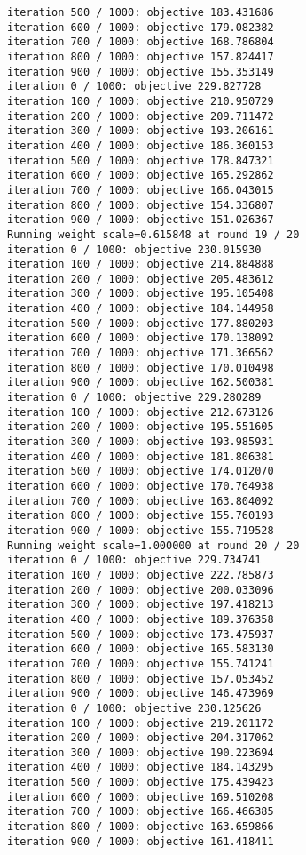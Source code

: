 \documentclass[11pt]{article}
\begin{document}
\begin{Verbatim}[commandchars=\\\{\}]
iteration 500 / 1000: objective 183.431686
iteration 600 / 1000: objective 179.082382
iteration 700 / 1000: objective 168.786804
iteration 800 / 1000: objective 157.824417
iteration 900 / 1000: objective 155.353149
iteration 0 / 1000: objective 229.827728
iteration 100 / 1000: objective 210.950729
iteration 200 / 1000: objective 209.711472
iteration 300 / 1000: objective 193.206161
iteration 400 / 1000: objective 186.360153
iteration 500 / 1000: objective 178.847321
iteration 600 / 1000: objective 165.292862
iteration 700 / 1000: objective 166.043015
iteration 800 / 1000: objective 154.336807
iteration 900 / 1000: objective 151.026367
Running weight scale=0.615848 at round 19 / 20
iteration 0 / 1000: objective 230.015930
iteration 100 / 1000: objective 214.884888
iteration 200 / 1000: objective 205.483612
iteration 300 / 1000: objective 195.105408
iteration 400 / 1000: objective 184.144958
iteration 500 / 1000: objective 177.880203
iteration 600 / 1000: objective 170.138092
iteration 700 / 1000: objective 171.366562
iteration 800 / 1000: objective 170.010498
iteration 900 / 1000: objective 162.500381
iteration 0 / 1000: objective 229.280289
iteration 100 / 1000: objective 212.673126
iteration 200 / 1000: objective 195.551605
iteration 300 / 1000: objective 193.985931
iteration 400 / 1000: objective 181.806381
iteration 500 / 1000: objective 174.012070
iteration 600 / 1000: objective 170.764938
iteration 700 / 1000: objective 163.804092
iteration 800 / 1000: objective 155.760193
iteration 900 / 1000: objective 155.719528
Running weight scale=1.000000 at round 20 / 20
iteration 0 / 1000: objective 229.734741
iteration 100 / 1000: objective 222.785873
iteration 200 / 1000: objective 200.033096
iteration 300 / 1000: objective 197.418213
iteration 400 / 1000: objective 189.376358
iteration 500 / 1000: objective 173.475937
iteration 600 / 1000: objective 165.583130
iteration 700 / 1000: objective 155.741241
iteration 800 / 1000: objective 157.053452
iteration 900 / 1000: objective 146.473969
iteration 0 / 1000: objective 230.125626
iteration 100 / 1000: objective 219.201172
iteration 200 / 1000: objective 204.317062
iteration 300 / 1000: objective 190.223694
iteration 400 / 1000: objective 184.143295
iteration 500 / 1000: objective 175.439423
iteration 600 / 1000: objective 169.510208
iteration 700 / 1000: objective 166.466385
iteration 800 / 1000: objective 163.659866
iteration 900 / 1000: objective 161.418411

    \end{Verbatim}
\end{document}
